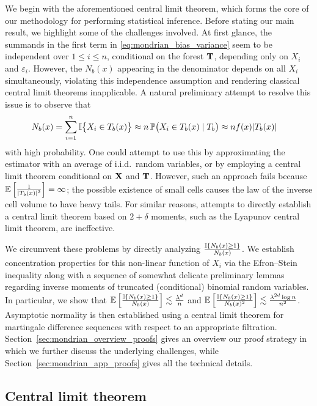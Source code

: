 We begin with the aforementioned central limit theorem, which forms the core of
our methodology for performing statistical inference. Before stating our main
result, we highlight some of the challenges involved. At first glance, the
summands in the first term in \eqref{eq:mondrian_bias_variance} seem to be
independent
over $1 \leq i \leq n$, conditional on the forest $\mathbf{T}$, depending only on
$X_i$ and $\varepsilon_i$. However, the $N_b(x)$ appearing in the denominator
depends on all $X_i$ simultaneously, violating this independence assumption and
rendering classical central limit theorems inapplicable. A natural preliminary
attempt to resolve this issue is to observe that
%
\begin{align*}
  N_b(x)&=
  \sum_{i=1}^{n} \mathbb{I}\big\{X_i \in T_b(x)\big\}
  \approx n \, \mathbb{P} \big( X_i \in T_b(x) \mid T_b \big)
  \approx n f(x) |T_b(x)|
\end{align*}
%
with high probability. One could attempt to use this by approximating the
estimator with an average of i.i.d.\ random variables, or by employing a
central limit theorem conditional on $\mathbf{X}$ and $\mathbf{T}$. However, such an approach
fails because $\mathbb{E} \left[ \frac{1}{|T_b(x)|^2} \right] = \infty$; the possible
existence of small cells causes the law of the inverse cell volume to have
heavy tails. For similar reasons, attempts to directly establish a central
limit theorem based on $2 + \delta$ moments, such as the Lyapunov central limit
theorem, are ineffective.

We circumvent these problems by directly analyzing
$\frac{\mathbb{I}\{N_b(x) \geq 1\}}{N_b(x)}$. We establish concentration properties for
this non-linear function of $X_i$ via the Efron--Stein inequality
\citep[Section 3.1]{boucheron2013concentration} along with a sequence of
somewhat delicate preliminary lemmas regarding inverse moments of truncated
(conditional) binomial random variables. In particular, we show that
$\mathbb{E} \left[ \frac{\mathbb{I} \{N_b(x) \geq 1\}}{N_b(x)} \right]
\lesssim \frac{\lambda^d}{n}$ and
$\mathbb{E} \left[ \frac{\mathbb{I} \{N_b(x) \geq 1\}}{N_b(x)^2} \right]
\lesssim \frac{\lambda^{2d} \log n}{n^2}$.
Asymptotic normality is then established using a central limit theorem for
martingale difference sequences \citep[Theorem~3.2]{hall1980martingale} with
respect to an appropriate filtration.
Section~\ref{sec:mondrian_overview_proofs} gives
an overview our proof strategy in which  we further discuss the underlying
challenges, while Section~\ref{sec:mondrian_app_proofs} gives all the technical
details.

\subsection{Central limit theorem}
\label{sec:mondrian_clt}

